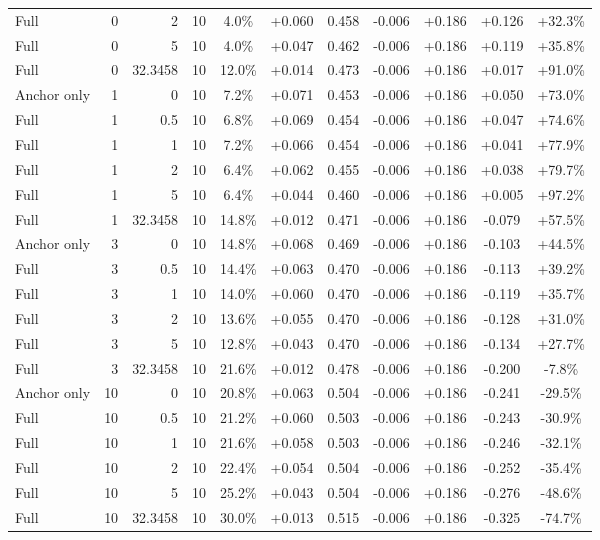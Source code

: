 \begin{table}[htbp]
\begin{tabular}{lrrrccccccc}
Full & 0 & 2 & 10 & 4.0\% & +0.060 & 0.458 & -0.006 & +0.186 & +0.126 & +32.3\% \\
Full & 0 & 5 & 10 & 4.0\% & +0.047 & 0.462 & -0.006 & +0.186 & +0.119 & +35.8\% \\
Full & 0 & 32.3458 & 10 & 12.0\% & +0.014 & 0.473 & -0.006 & +0.186 & +0.017 & +91.0\% \\
Anchor only & 1 & 0 & 10 & 7.2\% & +0.071 & 0.453 & -0.006 & +0.186 & +0.050 & +73.0\% \\
Full & 1 & 0.5 & 10 & 6.8\% & +0.069 & 0.454 & -0.006 & +0.186 & +0.047 & +74.6\% \\
Full & 1 & 1 & 10 & 7.2\% & +0.066 & 0.454 & -0.006 & +0.186 & +0.041 & +77.9\% \\
Full & 1 & 2 & 10 & 6.4\% & +0.062 & 0.455 & -0.006 & +0.186 & +0.038 & +79.7\% \\
Full & 1 & 5 & 10 & 6.4\% & +0.044 & 0.460 & -0.006 & +0.186 & +0.005 & +97.2\% \\
Full & 1 & 32.3458 & 10 & 14.8\% & +0.012 & 0.471 & -0.006 & +0.186 & -0.079 & +57.5\% \\
Anchor only & 3 & 0 & 10 & 14.8\% & +0.068 & 0.469 & -0.006 & +0.186 & -0.103 & +44.5\% \\
Full & 3 & 0.5 & 10 & 14.4\% & +0.063 & 0.470 & -0.006 & +0.186 & -0.113 & +39.2\% \\
Full & 3 & 1 & 10 & 14.0\% & +0.060 & 0.470 & -0.006 & +0.186 & -0.119 & +35.7\% \\
Full & 3 & 2 & 10 & 13.6\% & +0.055 & 0.470 & -0.006 & +0.186 & -0.128 & +31.0\% \\
Full & 3 & 5 & 10 & 12.8\% & +0.043 & 0.470 & -0.006 & +0.186 & -0.134 & +27.7\% \\
Full & 3 & 32.3458 & 10 & 21.6\% & +0.012 & 0.478 & -0.006 & +0.186 & -0.200 & -7.8\% \\
Anchor only & 10 & 0 & 10 & 20.8\% & +0.063 & 0.504 & -0.006 & +0.186 & -0.241 & -29.5\% \\
Full & 10 & 0.5 & 10 & 21.2\% & +0.060 & 0.503 & -0.006 & +0.186 & -0.243 & -30.9\% \\
Full & 10 & 1 & 10 & 21.6\% & +0.058 & 0.503 & -0.006 & +0.186 & -0.246 & -32.1\% \\
Full & 10 & 2 & 10 & 22.4\% & +0.054 & 0.504 & -0.006 & +0.186 & -0.252 & -35.4\% \\
Full & 10 & 5 & 10 & 25.2\% & +0.043 & 0.504 & -0.006 & +0.186 & -0.276 & -48.6\% \\
Full & 10 & 32.3458 & 10 & 30.0\% & +0.013 & 0.515 & -0.006 & +0.186 & -0.325 & -74.7\% \\

\end{tabular}
\end{table}
